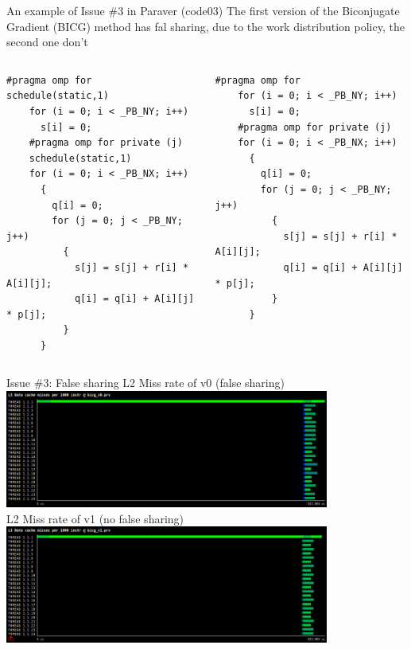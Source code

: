 \documentclass[10pt,xcolor=table]{beamer}
\begin{document}
\begin{frame}[fragile]{An example of Issue \#3 in Paraver (code03)}
The first version of the Biconjugate Gradient (BICG) method has fal sharing, due to the work distribution policy, the second one don't
\begin{columns}
\begin{column}{0.5\textwidth}
\begin{lstlisting}[style=shell,basicstyle=\scriptsize\ttfamily,gobble=3,caption={With False Sharing (v0)}]
    #pragma omp for schedule(static,1)
    for (i = 0; i < _PB_NY; i++)
      s[i] = 0;
    #pragma omp for private (j) 
    schedule(static,1)
    for (i = 0; i < _PB_NX; i++)
      {
        q[i] = 0;
        for (j = 0; j < _PB_NY; j++)
          {
            s[j] = s[j] + r[i] * A[i][j];
            q[i] = q[i] + A[i][j] * p[j];
          }
      }

  \end{lstlisting}
  \end{column}
\begin{column}{0.5\textwidth}
  \begin{lstlisting}[style=shell,gobble=3,basicstyle=\scriptsize\ttfamily,caption={Without False Sharing (v1)}]
    #pragma omp for
    for (i = 0; i < _PB_NY; i++)
      s[i] = 0;
    #pragma omp for private (j)
    for (i = 0; i < _PB_NX; i++)
      {
        q[i] = 0;
        for (j = 0; j < _PB_NY; j++)
          {
            s[j] = s[j] + r[i] * A[i][j];
            q[i] = q[i] + A[i][j] * p[j];
          }
      }

  \end{lstlisting}
  \end{column}
  \end{columns}
\end{frame}

\begin{frame}{Issue \#3: False sharing}
\centering
L2 Miss rate of v0 (false sharing)\\
\includegraphics[width=0.8\textwidth]{figs/L3_Data_cache_misses_per_1000_instr@bicg_v0.png}\\
L2 Miss rate of v1 (no false sharing)\\
\includegraphics[width=0.8\textwidth]{figs/L3_Data_cache_misses_per_1000_instr@bicg_v1.png}\\
\end{frame}
\end{document}
